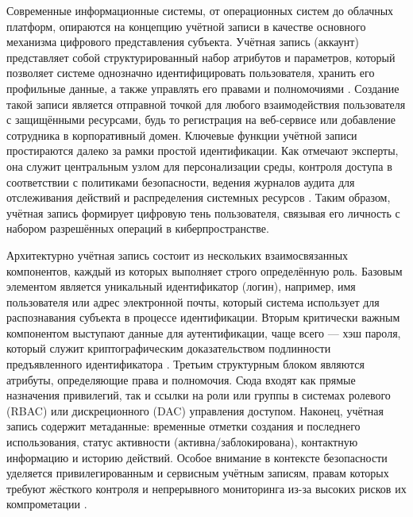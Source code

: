 \documentclass{SibFU-docs}
\begin{document}
Современные информационные системы, от операционных систем до облачных платформ, опираются на концепцию учётной записи в качестве основного механизма цифрового представления субъекта. Учётная запись (аккаунт) представляет собой структурированный набор атрибутов и параметров, который позволяет системе однозначно идентифицировать пользователя, хранить его профильные данные, а также управлять его правами и полномочиями \cite{pro32_2025_uchetnaya_zapis}. Создание такой записи является отправной точкой для любого взаимодействия пользователя с защищёнными ресурсами, будь то регистрация на веб-сервисе или добавление сотрудника в корпоративный домен. Ключевые функции учётной записи простираются далеко за рамки простой идентификации. Как отмечают эксперты, она служит центральным узлом для персонализации среды, контроля доступа в соответствии с политиками безопасности, ведения журналов аудита для отслеживания действий и распределения системных ресурсов \cite{identity_blitz_2025_policies}. Таким образом, учётная запись формирует цифровую тень пользователя, связывая его личность с набором разрешённых операций в киберпространстве.


Архитектурно учётная запись состоит из нескольких взаимосвязанных компонентов, каждый из которых выполняет строго определённую роль. Базовым элементом является уникальный идентификатор (логин), например, имя пользователя или адрес электронной почты, который система использует для распознавания субъекта в процессе идентификации. Вторым критически важным компонентом выступают данные для аутентификации, чаще всего — хэш пароля, который служит криптографическим доказательством подлинности предъявленного идентификатора \cite{pro32_2025_uchetnaya_zapis}. Третьим структурным блоком являются атрибуты, определяющие права и полномочия. Сюда входят как прямые назначения привилегий, так и ссылки на роли или группы в системах ролевого (RBAC) или дискреционного (DAC) управления доступом. Наконец, учётная запись содержит метаданные: временные отметки создания и последнего использования, статус активности (активна/заблокирована), контактную информацию и историю действий. Особое внимание в контексте безопасности уделяется привилегированным и сервисным учётным записям, правам которых требуют жёсткого контроля и непрерывного мониторинга из-за высоких рисков их компрометации \cite{keepersecurity_2025_service_accounts}.

\end{document}
